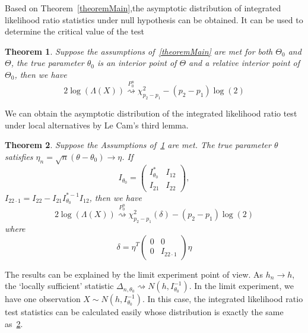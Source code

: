 \documentclass[3p]{elsarticle}
\theoremstyle{plain}
\newtheorem{theorem}{\quad\quad Theorem}
\theoremstyle{definition}
\theoremstyle{remark}
\begin{document}
Based on Theorem~\ref{theoremMain},the asymptotic distribution of integrated likelihood ratio statistics under null hypothesis can be obtained. It can be used to determine the critical value of the test
\begin{theorem}\label{theoremWilks}
    Suppose the assumptions of~\ref{theoremMain} are met for both $\Theta_0$ and $\Theta$,  the true parameter $\theta_0$ is an interior point of $\Theta$ and a relative interior point of $\Theta_0$, then we have
\begin{equation}
    2\log(\Lambda(X))\overset{P_0^n}{\rightsquigarrow} \chi^2_{p_2-p_1}-(p_2-p_1)\log(2)
\end{equation}

\end{theorem}

We can obtain the asymptotic distribution of the integrated likelihood ratio test under local alternatives by Le Cam's third lemma.
\begin{theorem}\label{theoremPower}
Suppose  the Assumptions of~\ref{theoremWilks} are met. The true parameter $\theta$ satisfies $\eta_n=\sqrt{n}(\theta-\theta_0)\to \eta$. If
\begin{equation}
    I_{\theta_0}=\left(
        \begin{matrix}
            I^*_{\theta_0}&I_{12}
            \\
            I_{21}&I_{22}
        \end{matrix}
    \right),
\end{equation}
$I_{22\cdot 1}=I_{22}-I_{21}I_{\theta_0}^{*-1}I_{12}$,
    then we have
\begin{equation}
    2\log(\Lambda(X))\overset{P_0^n}{\rightsquigarrow} \chi^2_{p_2-p_1}(\delta)-(p_2-p_1)\log(2)
\end{equation}
where
\begin{equation}
\delta=\eta^T
    \left(
        \begin{matrix}
            0&0\\
            0&I_{22\cdot 1}
        \end{matrix}
    \right)
    \eta
\end{equation}
\end{theorem}

The results can be explained by the limit experiment point of view. As $h_n\to h$, the `locally sufficient' statistic $\Delta_{n,\theta_0}\rightsquigarrow N(h,I^{-1}_{\theta_0})$. In the limit experiment, we have one observation $X\sim N(h,I_{\theta_0}^{-1})$. In this case, the integrated likelihood ratio test statistics can be calculated easily whose distribution is exactly the same as~\ref{theoremPower}.
\end{document}
